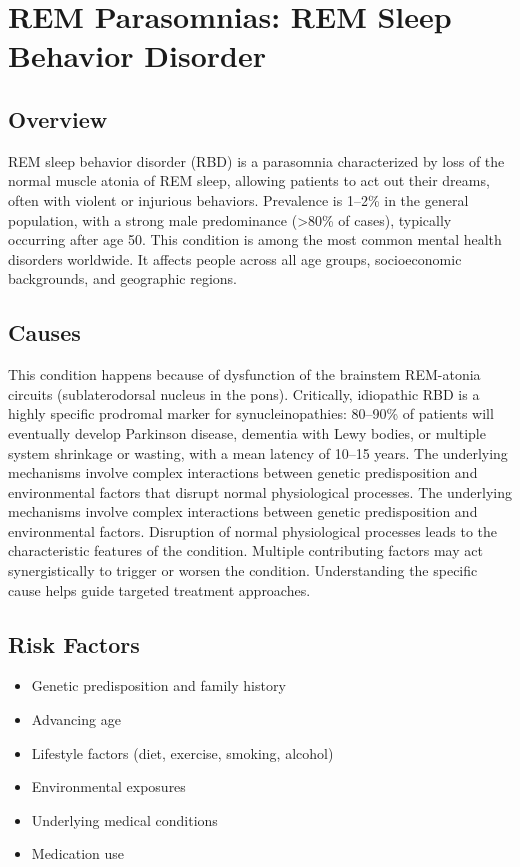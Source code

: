 \chapter{REM Parasomnias: REM Sleep Behavior Disorder}
\label{sec:REM Sleep Behavior Disorder}

\section{Overview}
REM sleep behavior disorder (RBD) is a parasomnia characterized by loss of the normal muscle atonia of REM sleep, allowing patients to act out their dreams, often with violent or injurious behaviors. Prevalence is 1--2\% in the general population, with a strong male predominance (>80\% of cases), typically occurring after age 50. This condition is among the most common mental health disorders worldwide. It affects people across all age groups, socioeconomic backgrounds, and geographic regions.
\section{Causes}
This condition happens because of dysfunction of the brainstem REM-atonia circuits (sublaterodorsal nucleus in the pons). Critically, idiopathic RBD is a highly specific prodromal marker for synucleinopathies: 80--90\% of patients will eventually develop Parkinson disease, dementia with Lewy bodies, or multiple system shrinkage or wasting, with a mean latency of 10--15 years. The underlying mechanisms involve complex interactions between genetic predisposition and environmental factors that disrupt normal physiological processes. The underlying mechanisms involve complex interactions between genetic predisposition and environmental factors. Disruption of normal physiological processes leads to the characteristic features of the condition. Multiple contributing factors may act synergistically to trigger or worsen the condition. Understanding the specific cause helps guide targeted treatment approaches.
\section{Risk Factors}


\begin{itemize}[noitemsep]
  \item Genetic predisposition and family history
  \item Advancing age
  \item Lifestyle factors (diet, exercise, smoking, alcohol)
  \item Environmental exposures
  \item Underlying medical conditions
  \item Medication use
\end{itemize}
